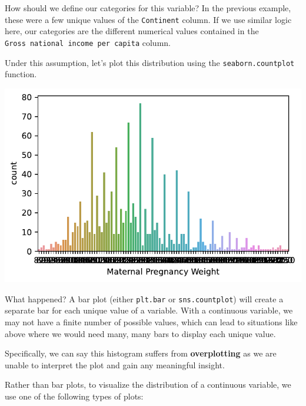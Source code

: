 \documentclass[
  letterpaper,
  DIV=11,
  numbers=noendperiod]{scrreprt}
\newenvironment{Shaded}{\begin{snugshade}}{\end{snugshade}}
\newcommand{\NormalTok}[1]{\textcolor[rgb]{0.00,0.23,0.31}{#1}}
\newcommand{\OperatorTok}[1]{\textcolor[rgb]{0.37,0.37,0.37}{#1}}
\newcommand{\StringTok}[1]{\textcolor[rgb]{0.13,0.47,0.30}{#1}}
\begin{document}
How should we define our categories for this variable? In the previous
example, these were a few unique values of the \texttt{Continent}
column. If we use similar logic here, our categories are the different
numerical values contained in the
\texttt{Gross\ national\ income\ per\ capita} column.

Under this assumption, let's plot this distribution using the
\texttt{seaborn.countplot} function.

\begin{Shaded}
\end{Shaded}

\includegraphics{visualization_1/visualization_1_files/figure-pdf/cell-7-output-1.pdf}

What happened? A bar plot (either \texttt{plt.bar} or
\texttt{sns.countplot}) will create a separate bar for each unique value
of a variable. With a continuous variable, we may not have a finite
number of possible values, which can lead to situations like above where
we would need many, many bars to display each unique value.

Specifically, we can say this histogram suffers from
\textbf{overplotting} as we are unable to interpret the plot and gain
any meaningful insight.

Rather than bar plots, to visualize the distribution of a continuous
variable, we use one of the following types of plots:
\end{document}
